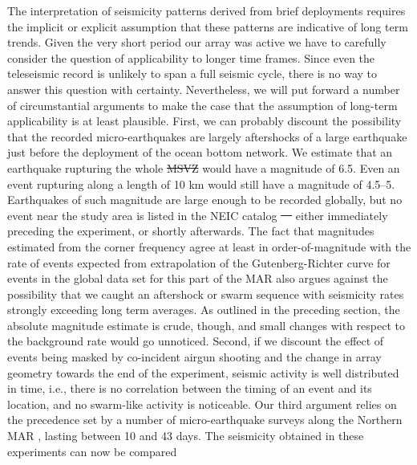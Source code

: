 \documentclass[jgr]{agu2001}
\newlength{\tw}
\providecommand{\DIFadd}[1]{{\protect\color{blue}\uwave{#1}}} %
\providecommand{\DIFdel}[1]{{\protect\color{red}\sout{#1}}}                      %
\providecommand{\DIFaddbegin}{} %
\providecommand{\DIFaddend}{} %
\providecommand{\DIFdelbegin}{} %
\providecommand{\DIFdelend}{} %
\begin{document}
\begin{article}
The interpretation of  seismicity patterns derived from brief deployments requires
the implicit or explicit assumption that these patterns are indicative
of long term trends.
Given the very short period our array was
active we have to carefully consider the question of applicability to longer
time frames.  Since even the teleseismic record is unlikely to
span a full seismic cycle, there is no way to answer this question with
 certainty.  Nevertheless, we will put forward a number of
circumstantial arguments to make the case that the assumption of long-term
applicability is at least plausible.   First, we can probably discount the
possibility that the recorded micro-earthquakes are largely
aftershocks of a large earthquake just before the deployment of the
ocean bottom network.  We estimate that an earthquake rupturing the whole
\DIFdelbegin \DIFdel{MSVZ }\DIFdelend \DIFaddbegin \DIFadd{MVSZ }\DIFaddend would have a magnitude of
6.5.  Even an event rupturing along a length of 10 km would still have
a magnitude of 4.5--5.  Earthquakes of such magnitude are large enough
to be recorded globally, but no event near the study area is listed in
the NEIC catalog \DIFdelbegin \DIFdel{\mbox{%
\citep{neic00}
}%
}\DIFdelend \DIFaddbegin \DIFadd{\mbox{%
\citep{neic}
}%
}\DIFaddend either immediately preceding the experiment, or shortly afterwards.
The fact that magnitudes estimated from the corner frequency agree at
least in order-of-magnitude with the rate of events expected from
extrapolation of the Gutenberg-Richter curve for events in the global
data set for this part of the MAR also argues against the possibility that
we caught an aftershock or swarm sequence with
seismicity rates strongly exceeding long term averages.  As outlined
in the preceding section, the
absolute magnitude estimate is crude, though,  and  small changes with respect to the
background rate would go unnoticed.
Second, if we discount the effect of events being masked by
co-incident airgun shooting and the change in array geometry towards
the end of the experiment, seismic activity is well distributed in
time, i.e., there is no correlation between the timing of an event and
its location, and no swarm-like activity is noticeable. 
Our third argument relies on the precedence set by a number of
micro-earthquake surveys along the Northern MAR
\citep{toomey88,kong92,wolfe95,barclay01}, lasting between 10 and 43
days. The seismicity obtained in these experiments can now be compared

\end{article}
\end{document}
